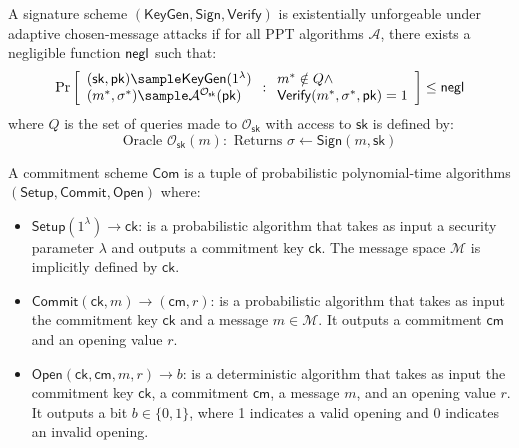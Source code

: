\begin{definition}
A signature scheme $(\mathsf{KeyGen}, \mathsf{Sign}, \mathsf{Verify})$ is existentially unforgeable under adaptive chosen-message attacks if for all PPT algorithms $\mathcal{A}$, there exists a negligible function $\mathsf{negl}$ such that:
$$\Pr\left[\begin{array}{l}
    (\mathsf{sk}, \mathsf{pk}) \sample \mathsf{KeyGen}(1^\lambda) \\
    (m^*, \sigma^*) \sample \mathcal{A}^{\mathcal{O}_{\mathsf{sk}}}(\mathsf{pk})
\end{array} : \begin{array}{l}
    m^* \notin Q \land \\
    \mathsf{Verify}(m^*, \sigma^*, \mathsf{pk}) = 1
\end{array}\right] \leq \negl$$
where $Q$ is the set of queries made to $\mathcal{O}_{\mathsf{sk}}$ with access to $\mathsf{sk}$ is defined by:
\[
\text{Oracle }\mathcal{O}_{\mathsf{sk}}(m): \text{ Returns } \sigma \gets \mathsf{Sign}(m, \mathsf{sk})
\]
\end{definition}

\begin{definition}\label{def:commitmentscheme}
A commitment scheme $\mathsf{Com}$ is a tuple of probabilistic polynomial-time algorithms $(\mathsf{Setup}, \mathsf{Commit}, \mathsf{Open})$ where:
\begin{itemize}
    \item $\mathsf{Setup}(1^\lambda) \rightarrow \mathsf{ck}$: is a probabilistic algorithm that takes as input a security parameter $\lambda$ and outputs a commitment key $\mathsf{ck}$. The message space $\mathcal{M}$ is implicitly defined by $\mathsf{ck}$.
    
    \item $\mathsf{Commit}(\mathsf{ck}, m) \rightarrow (\mathsf{cm}, r)$: is a probabilistic algorithm that takes as input the commitment key $\mathsf{ck}$ and a message $m \in \mathcal{M}$. It outputs a commitment $\mathsf{cm}$ and an opening value $r$.
    
    \item $\mathsf{Open}(\mathsf{ck}, \mathsf{cm}, m, r) \rightarrow b$: is a deterministic algorithm that takes as input the commitment key $\mathsf{ck}$, a commitment $\mathsf{cm}$, a message $m$, and an opening value $r$. It outputs a bit $b \in \{0,1\}$, where 1 indicates a valid opening and 0 indicates an invalid opening.
\end{itemize}
\end{definition}

